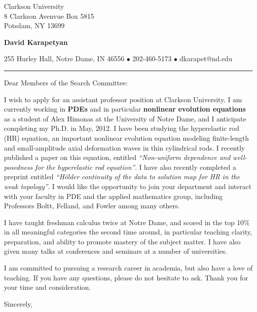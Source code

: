 \documentclass[12pt]{letter}
\date{\vspace{0.5cm}\flushleft \today}
\begin{document}
\begin{letter}{Clarkson University \\
8 Clarkson Avenvue Box 5815 \\
Potsdam, NY 13699}
    \begin{center}
{\bf {\Large David Karapetyan}}
\end{center}

\begin{center}
{255 Hurley Hall, Notre Dame, IN 46556  $\bullet$
202-460-5173 $\bullet$ dkarapet@nd.edu
}
\end{center}
\hrule

\opening{Dear Members of the Search Committee:\\}
%
%
I wish to apply for an assistant professor position at
Clarkson University. I am currently working in \textbf{PDEs} and in particular \textbf{nonlinear evolution equations} as a student of Alex Himonas at the
University of Notre Dame, and I anticipate completing my Ph.D.
in May, 2012. I have been studying the hyperelastic rod (HR) equation, an important nonlinear
evolution equation modeling finite-length and small-amplitude axial deformation
waves in thin cylindrical rods. I recently published a paper on this equation,
entitled {\it ``Non-uniform dependence and well-posedness for the hyperelastic
rod equation''}. I have also recently completed a preprint entitled {\it
  ``H\"older continuity of the data to solution map for HR in the weak
topology''}. I would like the opportunity to join your department and interact
with your faculty in PDE and the applied mathematics group, including Professors Boltt, Felland, and Fowler among many others. 

I have taught freshman calculus twice at Notre Dame, and scored in the top 10\%
in all meaningful categories the second time around, in particular teaching
clarity, preparation, and ability to promote mastery of the subject matter. I
have also given many talks at conferences and seminars at a number of
universities. 

I am committed to pursuing a research career in academia, but also have a love
of teaching. If you have any questions, please do not hesitate to ask. Thank you for your time and consideration. 

\closing{Sincerely,}


\end{letter}
\end{document}
